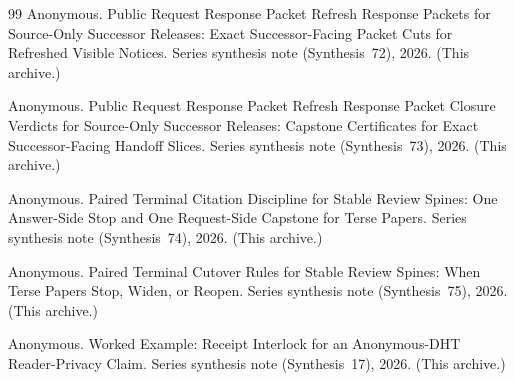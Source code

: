 \documentclass[11pt]{article}
\begin{document}
\begin{thebibliography}{99}
Anonymous.
\newblock Public Request Response Packet Refresh Response Packets for Source-Only Successor Releases: Exact Successor-Facing Packet Cuts for Refreshed Visible Notices.
\newblock Series synthesis note (Synthesis~72), 2026. (This archive.)

Anonymous.
\newblock Public Request Response Packet Refresh Response Packet Closure Verdicts for Source-Only Successor Releases: Capstone Certificates for Exact Successor-Facing Handoff Slices.
\newblock Series synthesis note (Synthesis~73), 2026. (This archive.)

Anonymous.
\newblock Paired Terminal Citation Discipline for Stable Review Spines: One Answer-Side Stop and One Request-Side Capstone for Terse Papers.
\newblock Series synthesis note (Synthesis~74), 2026. (This archive.)

Anonymous.
\newblock Paired Terminal Cutover Rules for Stable Review Spines: When Terse Papers Stop, Widen, or Reopen.
\newblock Series synthesis note (Synthesis~75), 2026. (This archive.)

Anonymous.
\newblock Worked Example: Receipt Interlock for an Anonymous-DHT Reader-Privacy Claim.
\newblock Series synthesis note (Synthesis~17), 2026. (This archive.)

\end{thebibliography}
\end{document}
